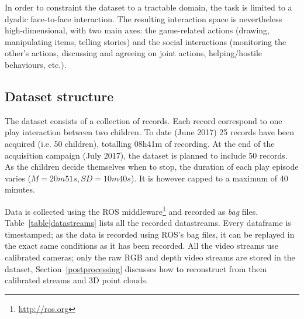 \documentclass{article}
\newcommand{\ie}{i.e.\xspace}
\begin{document}
In order to constraint the dataset to a tractable domain, the task is limited to
a dyadic face-to-face interaction.  The resulting interaction space is
nevertheless high-dimensional, with two main axes: the game-related actions
(drawing, manipulating items, telling stories) and the social interactions
(monitoring the other's actions, discussing and agreeing on joint actions,
helping/hostile behaviours, etc.).

%
%
%
%
%



\subsection{Dataset structure}

The dataset consists of a collection of records. Each record correspond to one
play interaction between two children. To date (June 2017) 25 records have been
acquired (\ie 50 children), totalling 08h41m of recording. At the end of the acquisition campaign
(July 2017), the dataset is planned to include 50 records. As
the children decide themselves when to stop, the duration of each play episode varies ($M=20m51s,
SD=10m40s$). It is however capped to a maximum of 40 minutes.

Data is collected using the ROS middleware\footnote{\url{http://ros.org}} and
recorded as \emph{bag} files. Table~\ref{table|datastreams} lists all the
recorded datastreams.  Every dataframe is timestamped; as the data is recorded
using ROS's bag files, it can be replayed in the exact same conditions as it
has been recorded.  All the video streams use calibrated cameras; only the raw
RGB and depth video streams are stored in the dataset, Section~\ref{postprocessing} discusses
how to reconstruct from them calibrated streams and 3D point clouds.
\end{document}
